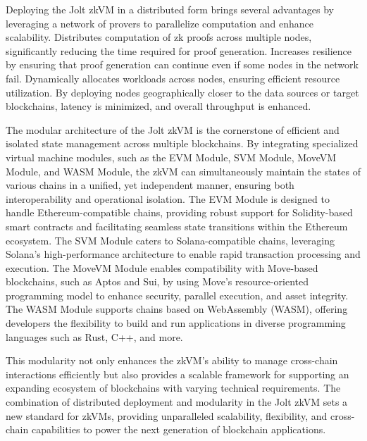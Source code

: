 Deploying the Jolt zkVM in a distributed form brings several advantages by leveraging a network of provers to parallelize computation and enhance scalability.  Distributes computation of zk proofs across multiple nodes, significantly reducing the time required for proof generation.  Increases resilience by ensuring that proof generation can continue even if some nodes in the network fail. Dynamically allocates workloads across nodes, ensuring efficient resource utilization. By deploying nodes geographically closer to the data sources or target blockchains, latency is minimized, and overall throughput is enhanced.  

The modular architecture of the Jolt zkVM is the cornerstone of efficient and isolated state management across multiple blockchains. By integrating specialized virtual machine modules, such as the EVM Module, SVM Module, MoveVM Module, and WASM Module, the zkVM can simultaneously maintain the states of various chains in a unified, yet independent manner, ensuring both interoperability and operational isolation. The EVM Module is designed to handle Ethereum-compatible chains, providing robust support for Solidity-based smart contracts and facilitating seamless state transitions within the Ethereum ecosystem. The SVM Module caters to Solana-compatible chains, leveraging Solana's high-performance architecture to enable rapid transaction processing and execution. The MoveVM Module enables compatibility with Move-based blockchains, such as Aptos and Sui, by using Move's resource-oriented programming model to enhance security, parallel execution, and asset integrity. The WASM Module supports chains based on WebAssembly (WASM), offering developers the flexibility to build and run applications in diverse programming languages such as Rust, C++, and more. 


This modularity not only enhances the zkVM's ability to manage cross-chain interactions efficiently but also provides a scalable framework for supporting an expanding ecosystem of blockchains with varying technical requirements. The combination of distributed deployment and modularity in the Jolt zkVM sets a new standard for zkVMs, providing unparalleled scalability, flexibility, and cross-chain capabilities to power the next generation of blockchain applications.